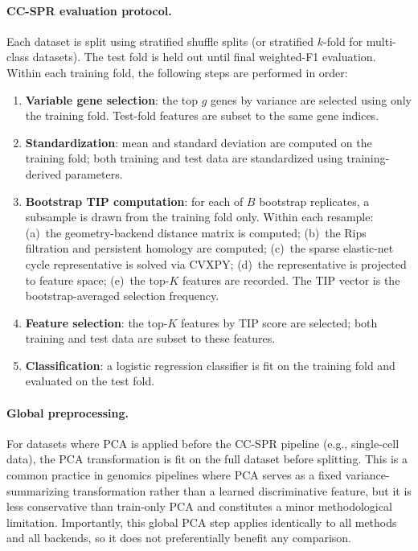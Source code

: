 \documentclass[11pt]{article}
\begin{document}
\paragraph{CC-SPR evaluation protocol.}
Each dataset is split using stratified shuffle splits (or stratified $k$-fold for multi-class datasets).
The test fold is held out until final weighted-F1 evaluation.
Within each training fold, the following steps are performed in order:
\begin{enumerate}[leftmargin=1.5em]
\item \textbf{Variable gene selection}: the top $g$ genes by variance are selected using only the training fold.
Test-fold features are subset to the same gene indices.
\item \textbf{Standardization}: mean and standard deviation are computed on the training fold; both training and test data are standardized using training-derived parameters.
\item \textbf{Bootstrap TIP computation}: for each of $B$ bootstrap replicates, a subsample is drawn from the training fold only. Within each resample:
  (a)~the geometry-backend distance matrix is computed;
  (b)~the Rips filtration and persistent homology are computed;
  (c)~the sparse elastic-net cycle representative is solved via CVXPY;
  (d)~the representative is projected to feature space;
  (e)~the top-$K$ features are recorded.
  The TIP vector is the bootstrap-averaged selection frequency.
\item \textbf{Feature selection}: the top-$K$ features by TIP score are selected; both training and test data are subset to these features.
\item \textbf{Classification}: a logistic regression classifier is fit on the training fold and evaluated on the test fold.
\end{enumerate}

\paragraph{Global preprocessing.}
For datasets where PCA is applied before the CC-SPR pipeline (e.g., single-cell data), the PCA transformation is fit on the full dataset before splitting.
This is a common practice in genomics pipelines where PCA serves as a fixed variance-summarizing transformation rather than a learned discriminative feature, but it is less conservative than train-only PCA and constitutes a minor methodological limitation.
Importantly, this global PCA step applies identically to all methods and all backends, so it does not preferentially benefit any comparison.
\end{document}
